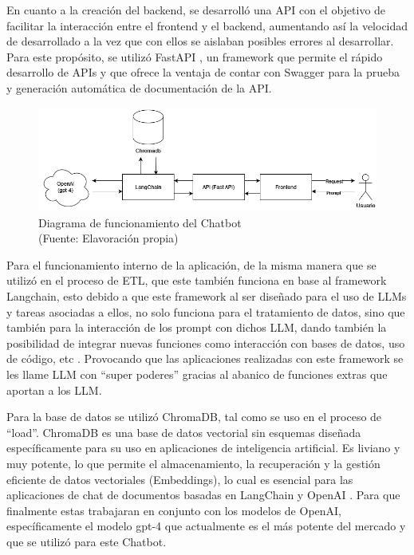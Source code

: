 En cuanto a la creación del backend, se desarrolló una API con el objetivo de facilitar la interacción entre el frontend y el backend, aumentando así la velocidad
de desarrollado a la vez que con ellos se aislaban posibles errores al desarrollar. Para este 
propósito, se utilizó FastAPI \cite{tiangoloFastAPI}, un framework que permite el rápido desarrollo de APIs y que ofrece la ventaja de contar con Swagger \cite{swaggerAPIDocumentation}
para la prueba y generación automática de documentación de la API.

\begin{figure}[ht!]
    \centering
    \includegraphics[width=.8\textwidth]{figures/finalhuemul.png}
    \caption[Diagrama de funcionamiento del Chatbot]{Diagrama de funcionamiento del Chatbot\\
    {\scriptsize (Fuente: Elavoración propia)}}
    \label{fig:chatbot1}
\end{figure}

Para el funcionamiento interno de la aplicación, de la misma manera que se utilizó en el proceso de ETL, 
que este también funciona en base al framework Langchain, esto debido a que este framework al ser diseñado para el 
uso de LLMs y tareas asociadas a ellos, no solo funciona para el tratamiento de datos, sino que también para la interacción 
de los prompt con dichos LLM, dando también la posibilidad de integrar nuevas funciones como interacción con 
bases de datos, uso de código, etc \cite{langchain1}. Provocando que las aplicaciones realizadas con este framework se les 
llame LLM con ``super poderes'' gracias al abanico de funciones extras que aportan a los LLM.

Para la base de datos se utilizó ChromaDB, tal como se uso en el proceso de ``load''. ChromaDB es una base de datos vectorial sin esquemas diseñada específicamente para 
su uso en aplicaciones de inteligencia artificial. Es liviano y muy potente, lo que permite el almacenamiento, la recuperación 
y la gestión eficiente de datos vectoriales (Embeddings), lo cual es esencial para las aplicaciones de chat de documentos 
basadas en LangChain y OpenAI \cite{langchain1}. Para que finalmente estas trabajaran en conjunto con los modelos de OpenAI, 
específicamente el modelo gpt-4 que actualmente es el más potente del mercado y que se utilizó para este Chatbot.

